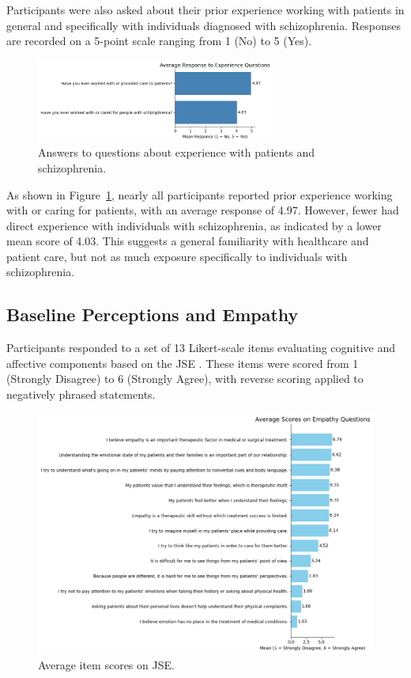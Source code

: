 Participants were also asked about their prior experience working with patients in general and specifically with individuals diagnosed with schizophrenia. Responses are recorded on a 5-point scale ranging from 1 (No) to 5 (Yes).

\begin{figure}[H]
    \centering
    \includegraphics[width=0.7\textwidth]{../../Figures/experience-patients.png}
    \caption{Answers to questions about experience with patients and schizophrenia.}
    \label{fig:experience_patients}
\end{figure}

As shown in Figure~\ref{fig:experience_patients}, nearly all participants reported prior experience working with or caring for patients, with an average response of 4.97. However, fewer had direct experience with individuals with schizophrenia, as indicated by a lower mean score of 4.03. This suggests a general familiarity with healthcare and patient care, but not as much exposure specifically to individuals with schizophrenia.

\subsection{Baseline Perceptions and Empathy}

Participants responded to a set of 13 Likert-scale items evaluating cognitive and affective components based on the JSE \cite{Hojat2002}. These items were scored from 1 (Strongly Disagree) to 6 (Strongly Agree), with reverse scoring applied to negatively phrased statements.

\begin{figure}[htbp]
    \centering
    \includegraphics[width=\columnwidth]{../../Figures/avg-scores-pre.png}
    \caption{Average item scores on JSE.}
    \label{fig:avg_scores_pre}
\end{figure}

